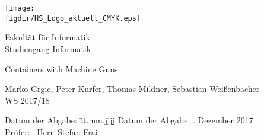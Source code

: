\begin{titlepage}

\raggedleft

\vspace*{-2cm}

\texttt{[image: \\figdir/HS\_Logo\_aktuell\_CMYK.eps]}

\vfill

\centering
\LARGE
Fakultät für Informatik  \vspace{0.5cm}\\
\Large
Studiengang Informatik

\vspace{2cm}

\LARGE

Containers with Machine Guns
\vspace{2cm}

\Large
Marko Grgic, Peter Kurfer, Thomas Mildner, Sebastian Weißenbacher\\
WS 2017/18

\vspace{1.5cm}

\vspace{1cm}

\flushleft
 \Large
\vspace*{\fill}

\begin{tabbing}
Datum der Abgabe: \= tt.mm.jjjj \kill
Datum der Abgabe: . Dezember 2017 \\
Prüfer: \> \ Herr\ Stefan Frai\\
\end{tabbing}

\end{titlepage}

\cleardoubleemptypage


